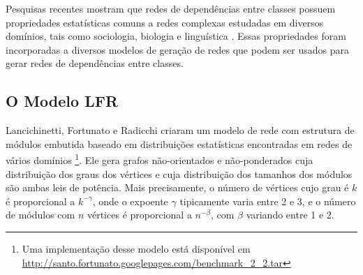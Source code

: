 \documentclass{acm_proc_article-sp}
\begin{document}
Pesquisas recentes mostram que redes de dependências entre classes possuem propriedades estatísticas comuns a redes complexas estudadas em diversos domínios, tais como sociologia, biologia e linguística \cite{Myers2003,Valverde2003}. Essas propriedades foram incorporadas a diversos modelos de geração de redes \cite{Bollobas2003,Lancichinetti2008} que podem ser usados para gerar redes de dependências entre classes. 

%
%
%
%

\subsection{O Modelo LFR}

Lancichinetti, Fortunato e Radicchi \cite{Lancichinetti2008} criaram um modelo de rede com estrutura de módulos embutida baseado em distribuições estatísticas encontradas em redes de vários domínios \footnote{Uma implementação desse modelo está disponível em \url{http://santo.fortunato.googlepages.com/benchmark_2_2.tar}}. Ele gera grafos não-orientados e não-ponderados cuja distribuição dos graus dos vértices e cuja distribuição dos tamanhos dos módulos são ambas leis de potência. Mais precisamente, o número de vértices cujo grau é $k$ é proporcional a $k^{-\gamma}$, onde o expoente $\gamma$ tipicamente varia entre 2 e 3, e o número de módulos com $n$ vértices é proporcional a $n^{-\beta}$, com $\beta$ variando entre 1 e 2.
\end{document}
